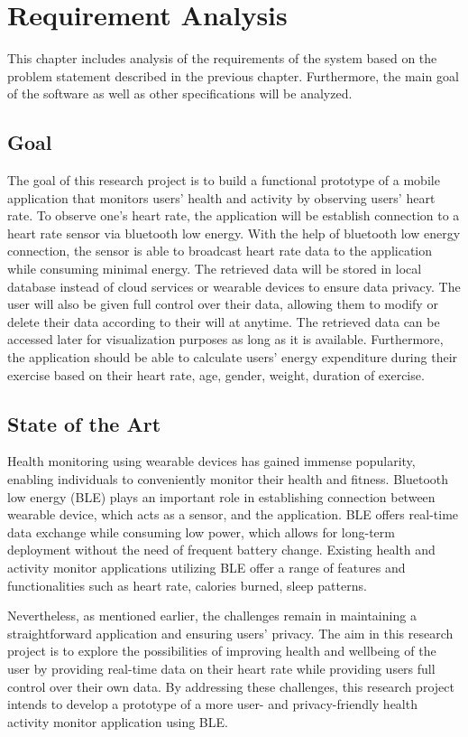 \chapter{Requirement Analysis}
This chapter includes analysis of the requirements of the system based on the problem statement described in the previous chapter. Furthermore, the main goal of the software as well as other specifications will be analyzed.

\section{Goal}
The goal of this research project is to build a functional prototype of a mobile application that monitors users' health and activity by observing users' heart rate. To observe one's heart rate, the application will be establish connection to a heart rate sensor via bluetooth low energy.
With the help of bluetooth low energy connection, the sensor is able to broadcast heart rate data to the application while consuming minimal energy.
The retrieved data will be stored in local database instead of cloud services or wearable devices to ensure data privacy. The user will also be given full control over their data, allowing them to modify or delete their data according to their will at anytime.
The retrieved data can be accessed later for visualization purposes as long as it is available. Furthermore, the application should be able to calculate users' energy expenditure during their exercise based on their heart rate, age, gender, weight, duration of exercise.

\section{State of the Art}
Health monitoring using wearable devices has gained immense popularity, enabling individuals to conveniently monitor their health and fitness. Bluetooth low energy (BLE) plays an important role in establishing connection between wearable device, which acts as a sensor, and the application. 
BLE offers real-time data exchange while consuming low power, which allows for long-term deployment without the need of frequent battery change. \cite{strey2013ble}
Existing health and activity monitor applications utilizing BLE offer a range of features and functionalities such as heart rate, calories burned, sleep patterns.

Nevertheless, as mentioned earlier, the challenges remain in maintaining a straightforward application and ensuring users' privacy. The aim in this research project is to explore the possibilities of improving health and wellbeing of the user by providing real-time data on their heart rate while providing users full control over their own data.
By addressing these challenges, this research project intends to develop a prototype of a more user- and privacy-friendly health activity monitor application using BLE.
\newpage


